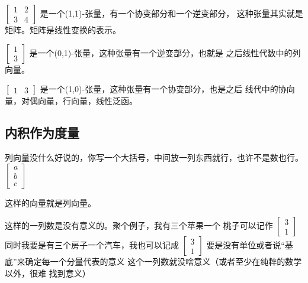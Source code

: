 \documentclass{book}
\begin{document}
\begin{CJK}{UTF8}{gbsn}
    $\left[\begin{matrix}
                1 & 2 \\
                3 & 4
            \end{matrix}\right]$
    是一个(1,1)-张量，有一个协变部分和一个逆变部分，
    这种张量其实就是矩阵。矩阵是线性变换的表示。

    $\left[\begin{matrix}
                1 \\
                3
            \end{matrix}\right]$
    是一个(0,1)-张量，这种张量有一个逆变部分，也就是
    之后线性代数中的列向量。

    $\left[\begin{matrix}
                1 & 3
            \end{matrix}\right]$
    是一个(1,0)-张量，这种张量有一个协变部分，也是之后
    线代中的协向量，对偶向量，行向量，线性泛函。

    \subsection{内积作为度量}
    列向量没什么好说的，你写一个大括号，中间放一列东西就行，也许不是数也行。
    $\left[\begin{matrix}
                a \\
                b \\
                c
            \end{matrix}\right]$

    这样的向量就是列向量。

    这样的一列数是没有意义的。聚个例子，我有三个苹果一个
    桃子可以记作
    $\left[\begin{matrix}
                3 \\
                1
            \end{matrix}\right]$
    同时我要是有三个房子一个汽车，我也可以记成
    $\left[\begin{matrix}
                3 \\
                1
            \end{matrix}\right]$
    要是没有单位或者说“基底”来确定每一个分量代表的意义
    这个一列数就没啥意义（或者至少在纯粹的数学以外，很难
    找到意义）


\end{CJK}
\end{document}
